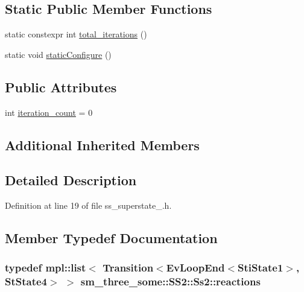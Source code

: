 \subsection*{Static Public Member Functions}
\begin{DoxyCompactItemize}
\item 
static constexpr int \hyperlink{structsm__three__some_1_1SS2_1_1Ss2_a40a682abb6bcacffdc2886c531aa8e10}{total\+\_\+iterations} ()
\item 
static void \hyperlink{structsm__three__some_1_1SS2_1_1Ss2_a6c51acd334a35a374d101d8d3dae7317}{static\+Configure} ()
\end{DoxyCompactItemize}
\subsection*{Public Attributes}
\begin{DoxyCompactItemize}
\item 
int \hyperlink{structsm__three__some_1_1SS2_1_1Ss2_ad0f43df403bcb029afb07a0f52699c60}{iteration\+\_\+count} = 0
\end{DoxyCompactItemize}
\subsection*{Additional Inherited Members}


\subsection{Detailed Description}


Definition at line 19 of file ss\+\_\+superstate\+\_.\+h.



\subsection{Member Typedef Documentation}
\subsubsection[{\texorpdfstring{reactions}{reactions}}]{\setlength{\rightskip}{0pt plus 5cm}typedef mpl\+::list$<$ Transition$<$Ev\+Loop\+End$<${\bf Sti\+State1}$>$, {\bf St\+State4}$>$ $>$ {\bf sm\+\_\+three\+\_\+some\+::\+S\+S2\+::\+Ss2\+::reactions}}\hypertarget{structsm__three__some_1_1SS2_1_1Ss2_a7b8b6caf125da7746c3158cee533442b}{}\label{structsm__three__some_1_1SS2_1_1Ss2_a7b8b6caf125da7746c3158cee533442b}


